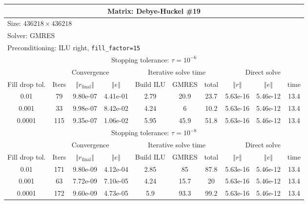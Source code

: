 \documentclass[oneside,final]{amsart}  %
\begin{document}
\begin{tabular}{|c|c|c|c|c|c|c|c|c|c|}
\hline
\multicolumn{10}{|c|}{Matrix: Debye-Huckel \#19}\tabularnewline
\hline
  \multicolumn{10}{|l|}{Size: $436218\times436218$}\tabularnewline
\hline
\multicolumn{10}{|l|}{Solver: GMRES}\tabularnewline
\hline
\multicolumn{10}{|l|}{Preconditioning: ILU right, \texttt{fill\_factor=15}}\tabularnewline
\hline
\hline
\multicolumn{10}{|c|}{Stopping tolerance: $\tau=10^{-6}$}\tabularnewline
\hline
\hline
 & \multicolumn{3}{c|}{Convergence} & \multicolumn{3}{c|}{Iterative solve time} & \multicolumn{3}{c|}{Direct solve}\tabularnewline
\hline
Fill drop tol.  & Iters & $\left\Vert r_{\text{final}}\right\Vert $  & $\left\Vert e\right\Vert $  & Build ILU  & GMRES  & total  & $\left\Vert r\right\Vert $ & $\left\Vert e\right\Vert $  & time\tabularnewline
\hline
0.01   & 79  & 9.80e-07 & 4.41e-01 &    2.79 &    20.9 &    23.7 & 5.63e-16 & 5.46e-12 &      13.4\\
  \hline
0.001  & 33  & 9.98e-07 & 8.42e-02 &    4.24 &       6 &    10.2 & 5.63e-16 & 5.46e-12 &      13.4\\
  \hline
0.0001 & 115 & 9.35e-07 & 1.06e-02 &    5.95 &    45.9 &    51.8 & 5.63e-16 & 5.46e-12 &      13.4\\
  \hline
\hline
\multicolumn{10}{|c|}{Stopping tolerance: $\tau=10^{-8}$}\tabularnewline
\hline
\hline
 & \multicolumn{3}{c|}{Convergence} & \multicolumn{3}{c|}{Iterative solve time} & \multicolumn{3}{c|}{Direct solve }\tabularnewline
\hline
Fill drop tol.  & Iters  & $\left\Vert r_{\text{final}}\right\Vert $  & $\left\Vert e\right\Vert $ & Build ILU  & GMRES  & total  & $\left\Vert r\right\Vert $  & $\left\Vert e\right\Vert $  & time\tabularnewline
\hline
0.01   & 171 & 9.80e-09 & 4.12e-04 &    2.85 &      85 &    87.8 & 5.63e-16 & 5.46e-12 &      13.4\\
  \hline
0.001  & 63  & 7.72e-09 & 7.10e-05 &    4.24 &    15.7 &      20 & 5.63e-16 & 5.46e-12 &      13.4\\
  \hline
0.0001 & 172 & 9.60e-09 & 4.73e-05 &     5.9 &    93.3 &    99.2 & 5.63e-16 & 5.46e-12 &      13.4\\
  \hline
\end{tabular}
\end{document}

